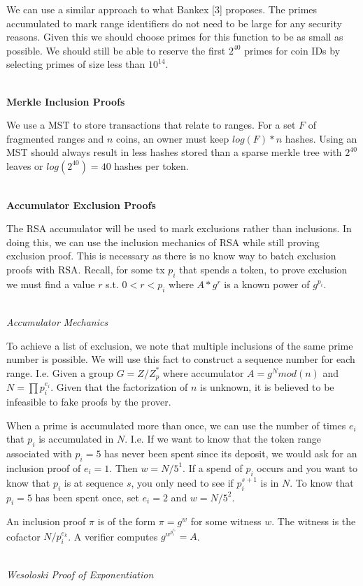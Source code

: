 \documentclass[12pt]{article}
\begin{document}
We can use a similar approach to what Bankex [3] proposes. The primes accumulated to mark range identifiers do not need to be large for any security reasons. Given this we should choose primes for this function to be as small as possible. We should still be able to reserve the first $2^{40}$ primes for coin IDs by selecting primes of size less than $10^{14}$.
\\
\\
\centerline{\textbf{Merkle Inclusion Proofs}}

We use a MST to store transactions that relate to ranges. For a set $F$ of fragmented ranges and $n$ coins, an owner must keep $log(F) * n$ hashes. Using an MST should always result in less hashes stored than a sparse merkle tree with $2^{40}$ leaves or $log(2^{40}) =40$ hashes per token.
\\
\\
\centerline{\textbf{Accumulator Exclusion Proofs}}

The RSA accumulator will be used to mark exclusions rather than inclusions. In doing this, we can use the inclusion mechanics of RSA while still proving exclusion proof. This is necessary as there is no know way to batch exclusion proofs with RSA. Recall, for some tx $p_i$ that spends a token, to prove exclusion we must find a value $r$ s.t. $0 < r < p_i$ where $A * g^r$ is a known power of $g^{p_i}$.
\\
\\
\centerline{\textit{Accumulator Mechanics}}

To achieve a list of exclusion, we note that multiple inclusions of the same prime number is possible. We will use this fact to construct a sequence number for each range. I.e. Given a group $G = Z / Z_p^*$ where accumulator $A = g^N mod(n)$ and $N=\prod{p_i^{e_i}}$. Given that the factorization of $n$ is unknown, it is believed to be infeasible to fake proofs by the prover.

When a prime is accumulated more than once, we can use the number of times $e_i$ that $p_i$ is accumulated in $N$. I.e. If we want to know that the token range associated with $p_i = 5$ has never been spent since its deposit, we would ask for an inclusion proof of $e_i = 1$. Then $w = N/5^1$. If a spend of $p_i$ occurs and you want to know that $p_i$ is at sequence $s$, you only need to see if $p_i^{s+1}$ is in $N$. To know that $p_i = 5$ has been spent once, set $e_i = 2$ and $w = N/5^2$. 

An inclusion proof $\pi$ is of the form $\pi = g^w$ for some witness $w$. The witness is the cofactor $N/p_i^{e_k}$. A verifier computes $g^{w^{p_i^{e_i}}} = A$.
\\
\\
\centerline{\textit{Wesoloski Proof of Exponentiation}}
\end{document}
